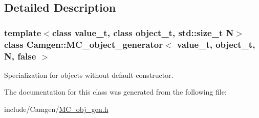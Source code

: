 \subsection{Detailed Description}
\subsubsection*{template$<$class value\-\_\-t, class object\-\_\-t, std\-::size\-\_\-t N$>$class Camgen\-::\-M\-C\-\_\-object\-\_\-generator$<$ value\-\_\-t, object\-\_\-t, N, false $>$}

Specialization for objects without default constructor. 

The documentation for this class was generated from the following file\-:\begin{DoxyCompactItemize}
\item 
include/\-Camgen/\hyperlink{a00673}{M\-C\-\_\-obj\-\_\-gen.\-h}\end{DoxyCompactItemize}
